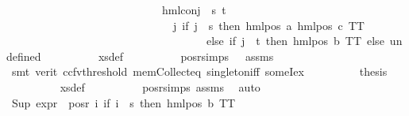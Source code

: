 \begin{isabellebody}
\ \ \ \ \ \ \ \ \ \ \ \ \ \ \ \ \ \ \ \ \ \ \ \ \ \ \ \ {\isacharparenleft}{\kern0pt}hml{\isacharunderscore}{\kern0pt}conj\ {\isacharbraceleft}{\kern0pt}{\isacharbraceright}{\kern0pt}\ {\isacharbraceleft}{\kern0pt}s{\isacharcomma}{\kern0pt}\ t{\isacharbraceright}{\kern0pt}\isanewline
\ \ \ \ \ \ \ \ \ \ \ \ \ \ \ \ \ \ \ \ \ \ \ \ \ \ \ \ \ \ {\isacharparenleft}{\kern0pt}{\isasymlambda}j{\isachardot}{\kern0pt}\ if\ j\ {\isacharequal}{\kern0pt}\ s\ then\ hml{\isacharunderscore}{\kern0pt}pos\ a\ {\isacharparenleft}{\kern0pt}hml{\isacharunderscore}{\kern0pt}pos\ c\ TT{\isacharparenright}{\kern0pt}\isanewline
\ \ \ \ \ \ \ \ \ \ \ \ \ \ \ \ \ \ \ \ \ \ \ \ \ \ \ \ \ \ \ \ \ \ \ \ else\ if\ j\ {\isacharequal}{\kern0pt}\ t\ then\ hml{\isacharunderscore}{\kern0pt}pos\ b\ TT\ else\ undefined{\isacharparenright}{\kern0pt}{\isacharparenright}{\kern0pt}{\isacharparenright}{\kern0pt}{\isachardoublequoteclose}\isanewline
\ \ \ \ \ \ \ \ \isamarkupfalse%
\ xs{\isacharunderscore}{\kern0pt}def\isanewline
\ \ \ \ \ \ \ \ \isamarkupfalse%
\ pos{\isacharunderscore}{\kern0pt}r{\isachardot}{\kern0pt}simps\ {}\ {}\ assms{\isacharparenleft}{\kern0pt}{}{\isacharparenright}{\kern0pt}\isanewline
\ \ \ \ \ \ \ \ \isamarkupfalse%
\ {\isacharparenleft}{\kern0pt}smt\ {\isacharparenleft}{\kern0pt}verit{\isacharcomma}{\kern0pt}\ ccfv{\isacharunderscore}{\kern0pt}threshold{\isacharparenright}{\kern0pt}\ mem{\isacharunderscore}{\kern0pt}Collect{\isacharunderscore}{\kern0pt}eq\ singleton{\isacharunderscore}{\kern0pt}iff\ someI{\isacharunderscore}{\kern0pt}ex{\isacharparenright}{\kern0pt}\isanewline
\ \ \ \ \ \ \isamarkupfalse%
\ \isamarkupfalse%
\ {\isacharquery}{\kern0pt}thesis\ \isanewline
\ \ \ \ \ \ \ \ \isamarkupfalse%
\ xs{\isacharunderscore}{\kern0pt}def\isanewline
\ \ \ \ \ \ \ \ \isamarkupfalse%
\ pos{\isacharunderscore}{\kern0pt}r{\isachardot}{\kern0pt}simps\ assms{\isacharparenleft}{\kern0pt}{}{\isacharparenright}{\kern0pt}\ \isamarkupfalse%
\ auto\isanewline
\ \ \ \ \isamarkupfalse%
\isanewline
\ \ \ \ \isamarkupfalse%
\ {\isachardoublequoteopen}Sup\ {\isacharparenleft}{\kern0pt}{\isacharparenleft}{\kern0pt}expr{\isacharunderscore}{\kern0pt}{}\ {\isacharbackquote}{\kern0pt}\ {\isacharparenleft}{\kern0pt}pos{\isacharunderscore}{\kern0pt}r\ {\isacharparenleft}{\kern0pt}{\isacharparenleft}{\kern0pt}{\isasymlambda}i{\isachardot}{\kern0pt}\ if\ i\ {\isacharequal}{\kern0pt}\ s\ then\ hml{\isacharunderscore}{\kern0pt}pos\ b\ TT\isanewline

\end{isabellebody}
